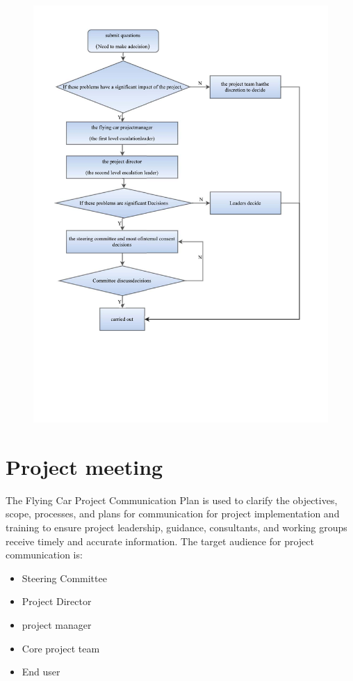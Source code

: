 \begin{figure}[!htb]
\centering
\includegraphics[width=14cm]{pic/ProjectDecisionProcess.pdf}
\end{figure}

\section{Project meeting}

The Flying Car Project Communication Plan is used to clarify the objectives, scope, processes, and plans for communication for project implementation and training to ensure project leadership, guidance, consultants, and working groups receive timely and accurate information. The target audience for project communication is:

\begin{itemize}
\item Steering Committee
\item Project Director
\item project manager
\item Core project team
\item End user
\end{itemize}

